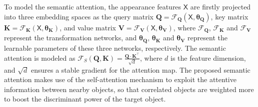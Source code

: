 \documentclass[letterpaper]{article} %
\newcommand\red[1]{\textcolor{red}{#1}}
\newcommand\blue[1]{\textcolor{blue}{#1}}
\newcommand\rjf[1]{\textcolor{red}{\{RJF: #1\}}}
\newcommand\qz[1]{\textcolor{blue}{\{QZ: #1\}}}
\begin{document}

To model the semantic attention, the appearance features $\bm{\mathsf{X}}$ are firstly projected into three embedding spaces as the query matrix $\bm{Q} = \mathcal{F}_{\bm{Q}}(\bm{\mathsf{X}}, \bm{\theta_{Q}})$, key matrix $\bm{K}= \mathcal{F}_{\bm{K}}(\bm{\mathsf{X}}, \bm{\theta_{K}})$, and value matrix $\bm{V}= \mathcal{F}_{\bm{V}}(\bm{\mathsf{X}}, \bm{\theta_{V}})$, %
where $\mathcal{F}_{\bm{Q}}$, $\mathcal{F}_{\bm{K}}$ and $\mathcal{F}_{\bm{V}}$ represent the transformation networks, and $\bm{\theta_{Q}}$, $\bm{\theta_{K}}$ and $\bm{\theta_{V}}$ represent the learnable parameters of these three networks, respectively. The semantic attention is modeled as $\mathcal{F}_{S}(\bm{Q},\bm{K}) = \frac{\bm{Q} \cdot \bm{K}^\top}{\sqrt{d}}$, 
where $d$ is the feature dimension, and $\sqrt{d}$ ensures a stable gradient for the attention map. The proposed semantic attention makes use of the self-attention mechanism to exploit the attentive information between nearby objects, so that correlated objects are weighted more to boost the discriminant power of the target object.

\end{document}
